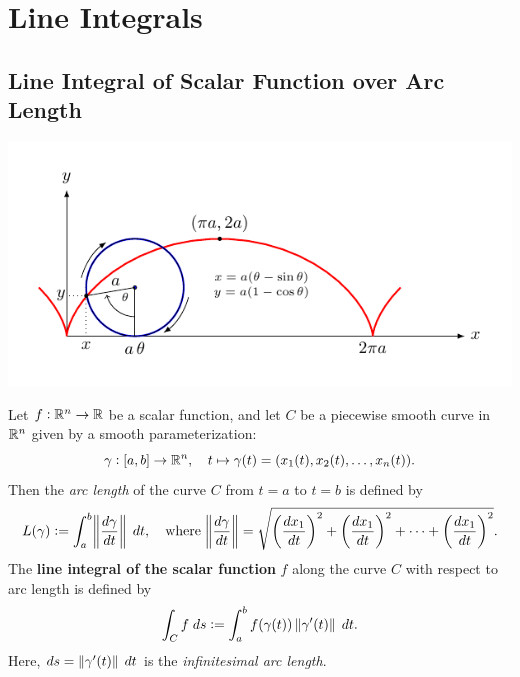 \documentclass[11pt,openany]{article}
\begin{document}
\newpage
\section*{Line Integrals}
\subsection*{Line Integral of Scalar Function over Arc Length}

\begin{center}
	\endanimateinline
\end{center}

\begin{center}
	\includegraphics[scale=1.25]{../riemann-tikz/cycloid}
\end{center}

\begin{definition*}
	Let $f:\mathbb{R}^n\to\mathbb{R}$ be a scalar function, and let $C$ be a piecewise smooth curve in 
	$\mathbb{R}^n$ given by a smooth parameterization: \[
	\gamma:[a,b]\to\mathbb{R}^n,\quad t\mapsto \gamma(t)=(x_1(t),x_2(t),\dots,x_n(t)).
	\] Then the \emph{arc length} of the curve $C$ from $t=a$ to $t=b$ is defined by \[
	L(\gamma):=\int_a^b\norm{\frac{ d\gamma}{dt}}\; dt,\quad\text{where}\; \norm{\frac{d\gamma}{dt}}=\sqrt{\left(\frac{dx_1}{dt}\right)^2+\left(\frac{dx_1}{dt}\right)^2+\cdots + \left(\frac{dx_1}{dt}\right)^2}.
	\]The \textbf{line integral of the scalar function} $f$ along the curve $C$ with respect to arc length is defined by \[
	\int_C f\; ds :=\int_a^bf(\gamma(t))\norm[0]{\gamma'(t)}\; dt.
	\] Here, $ds=\norm[0]{\gamma'(t)}\; dt$ is the \emph{infinitesimal arc length}.
\end{definition*}
\end{document}
